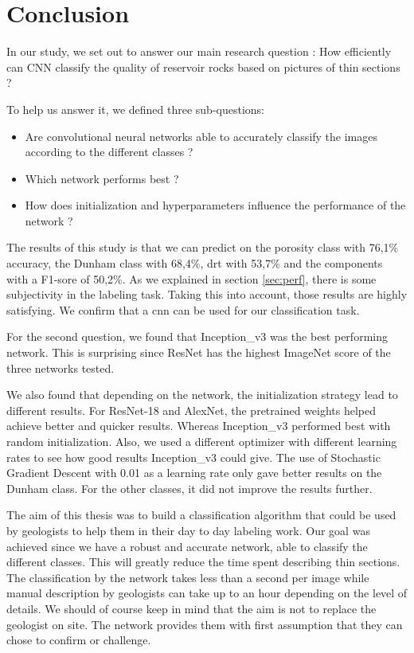 \chapter{Conclusion}\label{chp:conclusion}
In our study, we set out to answer our main research question :  How  efficiently  can  CNN  classify  the  quality  of  reservoir rocks based on pictures of thin sections ?

To help us answer it, we defined three sub-questions:
\begin{itemize}
    \item Are convolutional neural networks able to accurately classify the images according to the different classes ?
    \item Which network performs best ?
    \item How does initialization and hyperparameters influence the performance of the network ?
\end{itemize}


The results of this study is that we can predict on the porosity class with 76,1\% accuracy, the Dunham class with 68,4\%, \gls{drt} with 53,7\% and the components with a F1-sore of 50,2\%. As we explained in section \ref{sec:perf}, there is some subjectivity in the labeling task. Taking this into account, those results are highly satisfying. We confirm that a \gls{cnn} can be used for our classification task.

For the second question, we found that Inception\_v3 was the best performing network. This is surprising since ResNet has the highest ImageNet score of the three networks tested.

We also found  that depending on the network, the initialization strategy  lead to different results. For ResNet-18 and AlexNet, the pretrained weights helped achieve better and quicker results. Whereas Inception\_v3 performed best with random initialization. Also, we used a different optimizer with different learning rates to see how good results Inception\_v3 could give. The use of Stochastic Gradient Descent with 0.01 as a learning rate only gave better results on the Dunham class. For the other classes, it did not improve the results further.

The aim of this thesis was to build a classification algorithm that could be used by geologists to help them in their day to day labeling work. Our goal was achieved since we have a robust and accurate network, able to classify the different classes. This will greatly reduce the time spent describing thin sections. The classification by the network takes less than a second per image while manual description by geologists can take up to an hour depending on the level of details. We should of course keep in mind that the aim is not to replace the geologist on site. The network provides them with first assumption that they can chose to confirm or challenge. 


